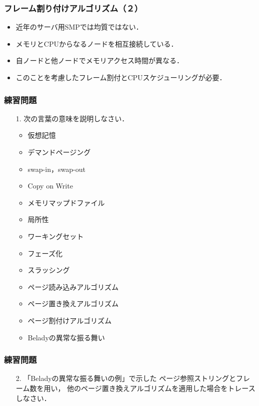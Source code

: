 \documentclass[unicode]{beamer}                   %
\begin{document}
\begin{frame}
  \frametitle{フレーム割り付けアルゴリズム（２）}
  \begin{itemize}
  \item 近年のサーバ用SMPでは均質ではない．
  \item メモリとCPUからなるノードを相互接続している．
  \item 自ノードと他ノードでメモリアクセス時間が異なる．
  \item このことを考慮したフレーム割付とCPUスケジューリングが必要．
  \end{itemize}
\end{frame}


\begin{frame}
  \frametitle{練習問題}
  \begin{enumerate}
  \item[1.] 次の言葉の意味を説明しなさい．
    \begin{itemize}
    \item 仮想記憶
    \item デマンドページング
    \item swap-in，swap-out
    \item Copy on Write
    \item メモリマップドファイル
    \item 局所性
    \item ワーキングセット
    \item フェーズ化
    \item スラッシング
    \item ページ読み込みアルゴリズム
    \item ページ置き換えアルゴリズム
    \item ページ割付けアルゴリズム
    \item Beladyの異常な振る舞い
    \end{itemize}
  \end{enumerate}
\end{frame}

\begin{frame}
  \frametitle{練習問題}
  \begin{enumerate}
  \item[2.] 「Beladyの異常な振る舞いの例」で示した
    ページ参照ストリングとフレーム数を用い，
    他のページ置き換えアルゴリズムを適用した場合をトレースしなさい．
  \end{enumerate}
  \vfill
  \vfill
\end{frame}
\end{document}
